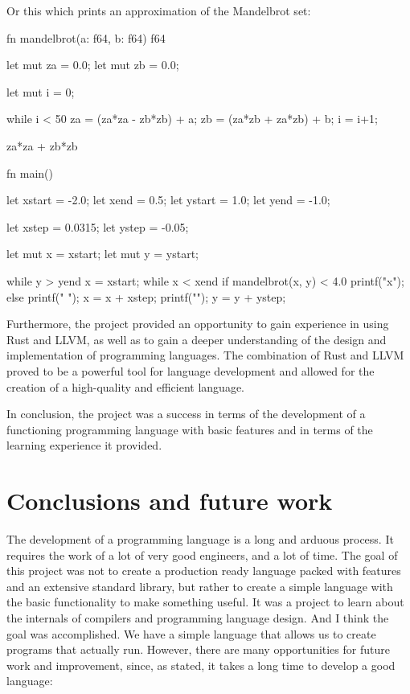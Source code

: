 ﻿\documentclass[10pt,a4paper,twocolumn,twoside]{article}
\begin{document}
Or this which prints an approximation of the Mandelbrot set:

\begin{code}
fn mandelbrot(a: f64, b: f64) f64 {
    let mut za = 0.0;
    let mut zb = 0.0;

    let mut i = 0;

    while i < 50 {
        za = (za*za - zb*zb) + a;
        zb = (za*zb + za*zb) + b;
        i = i+1;
    }

    za*za + zb*zb
}

fn main() {
    let xstart = -2.0;
    let xend = 0.5;
    let ystart = 1.0;
    let yend = -1.0;

    let xstep = 0.0315;
    let ystep = -0.05;

    let mut x = xstart;
    let mut y = ystart;

    while y > yend {
        x = xstart;
        while x < xend {
            if mandelbrot(x, y) < 4.0 {
                printf("x");
            } else {
                printf(" ");
            }
            x = x + xstep; 
        }
        printf("\n");
        y = y + ystep;
    }
}
\end{code}

Furthermore, the project provided an opportunity to gain experience in using
Rust and LLVM, as well as to gain a deeper understanding of the design and
implementation of programming languages. The combination of Rust and LLVM proved
to be a powerful tool for language development and allowed for the creation of a
high-quality and efficient language.

In conclusion, the project was a success in terms of the development of a
functioning programming language with basic features and in terms of the
learning experience it provided.

\section{Conclusions and future work}
The development of a programming language is a long and arduous process. It
requires the work of a lot of very good engineers, and a lot of time. The goal
of this project was not to create a production ready language packed with
features and an extensive standard library, but rather to create a simple
language with the basic functionality to make something useful. It was a project
to learn about the internals of compilers and programming language design. And I
think the goal was accomplished. We have a simple language that allows us to
create programs that actually run. However, there are many opportunities for
future work and improvement, since, as stated, it takes a long time to develop a
good language:
\end{document}
